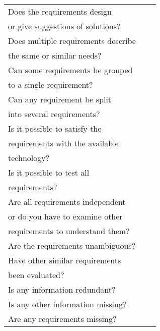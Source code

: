 \documentclass[a4paper]{article}
\begin{document}
\begin{tabular}{|l|l|l|}
		Does the requirements design &	& \\
		or give suggestions of solutions?	&	& \\ \hline
		Does multiple requirements describe	&	& \\
		the same or similar needs?	&	& \\ \hline
		Can some requirements be grouped	&	& \\
		to a single requirement?	&	& \\ \hline
		Can any requirement be split	&	& \\
		into several requirements?	&	& \\ \hline
		Is it possible to satisfy the	&	& \\
		requirements with the available	&	& \\
		technology?	&	& \\ \hline
		Is it possible to test all	&	& \\
		requirements? &	& \\ \hline
		Are all requirements independent	&	& \\
		or do you have to examine other	&	& \\
		requirements to understand them?	&	& \\ \hline
		Are the requirements unambiguous?	&	& \\ \hline
		Have other similar requirements	&	& \\
		been evaluated? 	&	& \\ \hline
		Is any information redundant?	&	& \\ \hline
		Is any other information missing?	&	&	\\ \hline
		Are any requirements missing?	&	&	\\ \hline	
	\end{tabular}
\end{document}
